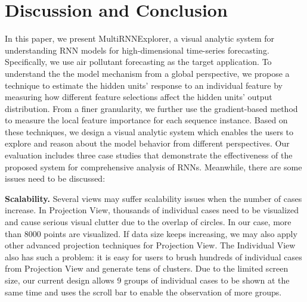 \section{Discussion and Conclusion}

In this paper, we present MultiRNNExplorer, a visual analytic system for understanding RNN models for high-dimensional time-series forecasting.
Specifically, we use air pollutant forecasting as the target application. 
To understand the the model mechanism from a global perspective, we propose a technique to estimate the hidden units' response to an individual feature by measuring how different feature selections affect the hidden units' output distribution. 
From a finer granularity, we further use the gradient-based method to measure the local feature importance for each sequence instance. 
Based on these techniques, we design a visual analytic system which enables the users to explore and reason about the model behavior from different perspectives. 
Our evaluation includes three case studies that demonstrate the effectiveness of the proposed system for comprehensive analysis of RNNs.
Meanwhile, there are some issues need to be discussed:

\textbf{Scalability.}
Several views may suffer scalability issues when the number of cases increase. 
In Projection View, thousands of individual cases need to be visualized and cause serious visual clutter due to the overlap of circles.  
In our case, more than 8000 points are visualized. 
If data size keeps increasing, we may also apply other advanced projection techniques\cite{van2017visual, pezzotti2016hierarchical} for Projection View. 
The Individual View also has such a problem: it is easy for users to brush hundreds of individual cases from Projection View and generate tens of clusters. 
Due to the limited screen size, our current design allows 9 groups of individual cases to be shown at the same time and uses the scroll bar to enable the observation of more groups.

